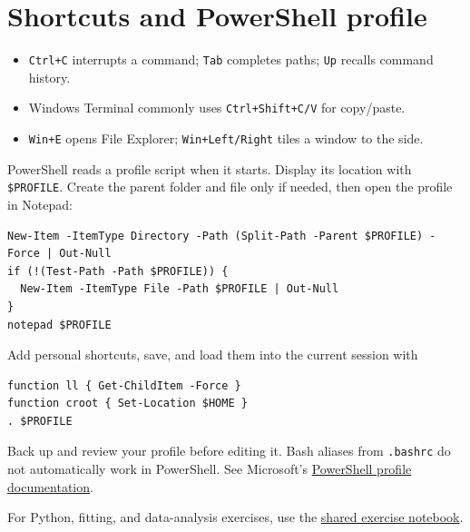 \documentclass[11pt]{article}
\begin{document}
\section{Shortcuts and PowerShell profile}
\begin{itemize}
\item \texttt{Ctrl+C} interrupts a command; \texttt{Tab} completes paths;
\texttt{Up} recalls command history.
\item Windows Terminal commonly uses \texttt{Ctrl+Shift+C/V} for copy/paste.
\item \texttt{Win+E} opens File Explorer; \texttt{Win+Left/Right} tiles a
window to the side.
\end{itemize}

PowerShell reads a profile script when it starts. Display its location with
\verb|$PROFILE|. Create the parent folder and file only if needed, then open
the profile in Notepad:
\begin{lstlisting}
New-Item -ItemType Directory -Path (Split-Path -Parent $PROFILE) -Force | Out-Null
if (!(Test-Path -Path $PROFILE)) {
  New-Item -ItemType File -Path $PROFILE | Out-Null
}
notepad $PROFILE
\end{lstlisting}
Add personal shortcuts, save, and load them into the current session with
\begin{lstlisting}
function ll { Get-ChildItem -Force }
function croot { Set-Location $HOME }
. $PROFILE
\end{lstlisting}
Back up and review your profile before editing it. Bash aliases from
\texttt{.bashrc} do not automatically work in PowerShell. See Microsoft's
\href{https://learn.microsoft.com/en-us/powershell/module/microsoft.powershell.core/about/about_profiles}{PowerShell
profile documentation}.


\noindent For Python, fitting, and data-analysis exercises, use the
\href{../Example_Code/Exersize.ipynb}{shared exercise notebook}.
\end{document}
